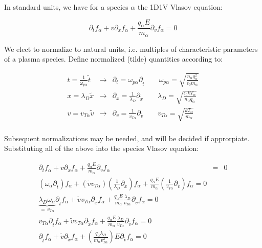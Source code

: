 In standard units, we have for a species $\alpha$ the 1D1V Vlasov equation:

$$\partial_t f_{\alpha} + v\partial_x f_{\alpha} + \frac{q_{\alpha}E}{m_{\alpha}} \partial_v f_{\alpha} = 0$$

We elect to normalize to natural units, i.e. multiples of characteristic parameters of a plasma species. Define normalized (tilde) quantities according to:

\begin{eqnarray*}
t = \frac{1}{\omega_{p\alpha}}\tilde{t} & \longrightarrow & \partial_t = \omega_{p\alpha}\partial_{\tilde{t}} \qquad \omega_{p\alpha} = \sqrt{\frac{n_{\alpha} q_{\alpha}^2}{\epsilon_0m_{\alpha}}} \\
x = \lambda_D \tilde{x} & \longrightarrow & \partial_x = \frac{1}{\lambda_D}\partial_{\tilde{x}} \qquad \lambda_D = \sqrt{\frac{\epsilon_0 kT_{\alpha}}{n_{\alpha}q_{\alpha}}} \\
v = v_{T\alpha} \tilde{v} & \longrightarrow & \partial_v = \frac{1}{v_{T\alpha}}\partial_{\tilde{v}} \qquad v_{T\alpha} = \sqrt{\frac{kT_{\alpha}}{m_{\alpha}}}\\
\end{eqnarray*}

Subsequent normalizations may be needed, and will be decided if approrpiate. Substituting all of the above into the species Vlasov equation:

\begin{eqnarray*}
\partial_t f_{\alpha} + v\partial_x f_{\alpha} + \frac{q_{\alpha}E}{m_{\alpha}} \partial_v f_{\alpha} & = & 0 \\
\left(\omega_{\alpha}\partial_{\tilde{t}}\right) f_{\alpha} + \left(\tilde{v}v_{T\alpha}\right) \left(\frac{1}{\lambda_D}\partial_{\tilde{x}}\right)f_{\alpha} + \frac{q_{\alpha}E}{m_{\alpha}}\left(\frac{1}{v_{T\alpha}}\partial_{\tilde{v}}\right) f_{\alpha} = 0 \\
\underbrace{\lambda_D\omega_{\alpha}}_{=\, v_{T\alpha}}\partial_{\tilde{t}} f_{\alpha} + \tilde{v}v_{T\alpha}\partial_{\tilde{x}}f_{\alpha} + \frac{q_{\alpha}E}{m_{\alpha}}\frac{\lambda_D}{v_{T\alpha}}\partial_{\tilde{v}} f_{\alpha} = 0 \\
v_{T\alpha}\partial_{\tilde{t}} f_{\alpha} + \tilde{v}v_{T\alpha}\partial_{\tilde{x}}f_{\alpha} + \frac{q_{\alpha}E}{m_{\alpha}}\frac{\lambda_D}{v_{T\alpha}}\partial_{\tilde{v}} f_{\alpha} = 0 \\
\partial_{\tilde{t}} f_{\alpha} + \tilde{v}\partial_{\tilde{x}}f_{\alpha} + \left(\frac{q_{\alpha}\lambda_D}{m_{\alpha}v_{T\alpha}^2}\right) E \partial_{\tilde{v}} f_{\alpha} = 0 \\
\end{eqnarray*}

